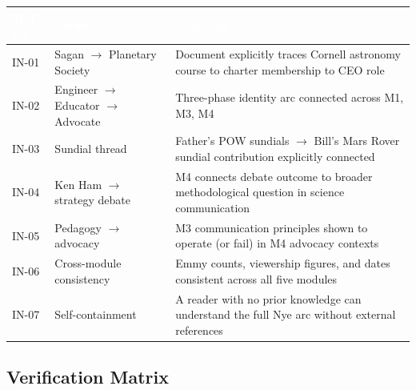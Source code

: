 \documentclass[11pt,letterpaper]{article}
\newcommand{\tableheader}[1]{\textbf{\sffamily\textcolor{white}{#1}}}
\begin{document}
\begin{center}
\begin{tabularx}{\textwidth}{C{1.5cm}L{3.5cm}X}
\toprule
{}
\tableheader{Test ID} & \tableheader{Verifies} & \tableheader{Expected} \\
\midrule
IN-01 & Sagan $\rightarrow$ Planetary Society & Document explicitly traces Cornell astronomy course to charter membership to CEO role \\
IN-02 & Engineer $\rightarrow$ Educator $\rightarrow$ Advocate & Three-phase identity arc connected across M1, M3, M4 \\
IN-03 & Sundial thread & Father's POW sundials $\rightarrow$ Bill's Mars Rover sundial contribution explicitly connected \\
IN-04 & Ken Ham $\rightarrow$ strategy debate & M4 connects debate outcome to broader methodological question in science communication \\
IN-05 & Pedagogy $\rightarrow$ advocacy & M3 communication principles shown to operate (or fail) in M4 advocacy contexts \\
IN-06 & Cross-module consistency & Emmy counts, viewership figures, and dates consistent across all five modules \\
IN-07 & Self-containment & A reader with no prior knowledge can understand the full Nye arc without external references \\
\bottomrule
\end{tabularx}
\end{center}

\subsection{Verification Matrix}
\end{document}
